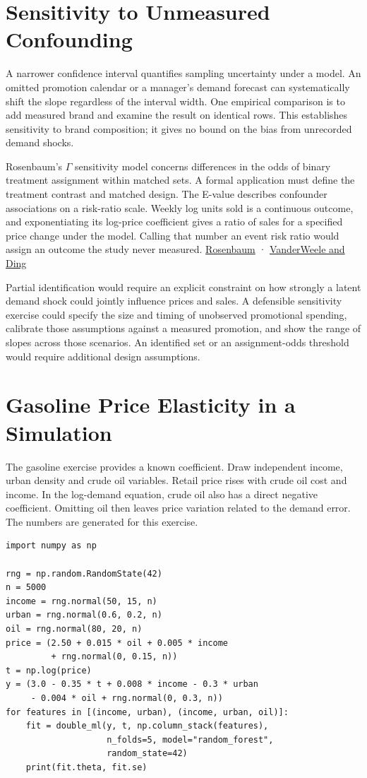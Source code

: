\section{Sensitivity to Unmeasured Confounding}\label{sec:sensitivity_analysis}

A narrower confidence interval quantifies sampling uncertainty under a model. An omitted promotion calendar or a manager's demand forecast can systematically shift the slope regardless of the interval width. One empirical comparison is to add measured brand and examine the result on identical rows. This establishes sensitivity to brand composition; it gives no bound on the bias from unrecorded demand shocks.

Rosenbaum's \(\Gamma\) sensitivity model concerns differences in the odds of binary treatment assignment within matched sets. A formal application must define the treatment contrast and matched design. The E-value describes confounder associations on a risk-ratio scale. Weekly log units sold is a continuous outcome, and exponentiating its log-price coefficient gives a ratio of sales for a specified price change under the model. Calling that number an event risk ratio would assign an outcome the study never measured. \href{https://doi.org/10.1007/978-1-4757-3692-2}{Rosenbaum} · \href{https://doi.org/10.7326/M16-2607}{VanderWeele and Ding}

Partial identification would require an explicit constraint on how strongly a latent demand shock could jointly influence prices and sales. A defensible sensitivity exercise could specify the size and timing of unobserved promotional spending, calibrate those assumptions against a measured promotion, and show the range of slopes across those scenarios. An identified set or an assignment-odds threshold would require additional design assumptions.

\section{Gasoline Price Elasticity in a Simulation}\label{sec:gasoline_application}

The gasoline exercise provides a known coefficient. Draw independent income, urban density and crude oil variables. Retail price rises with crude oil cost and income. In the log-demand equation, crude oil also has a direct negative coefficient. Omitting oil then leaves price variation related to the demand error. The numbers are generated for this exercise.

\begin{verbatim}
import numpy as np

rng = np.random.RandomState(42)
n = 5000
income = rng.normal(50, 15, n)
urban = rng.normal(0.6, 0.2, n)
oil = rng.normal(80, 20, n)
price = (2.50 + 0.015 * oil + 0.005 * income
         + rng.normal(0, 0.15, n))
t = np.log(price)
y = (3.0 - 0.35 * t + 0.008 * income - 0.3 * urban
     - 0.004 * oil + rng.normal(0, 0.3, n))
for features in [(income, urban), (income, urban, oil)]:
    fit = double_ml(y, t, np.column_stack(features),
                    n_folds=5, model="random_forest",
                    random_state=42)
    print(fit.theta, fit.se)
\end{verbatim}

